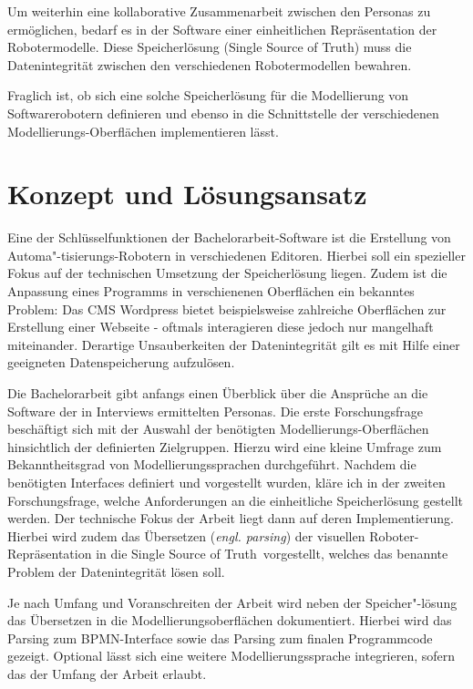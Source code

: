 \documentclass[a4paper, ngerman ]{article}
\newcommand{\ssot}{\glqq Single Source of Truth\grqq}
\begin{document}
Um weiterhin eine kollaborative Zusammenarbeit zwischen den Personas zu ermöglichen, bedarf es in der Software einer einheitlichen Repräsentation der Robotermodelle. Diese Speicherlösung (\ssot) muss die Datenintegrität zwischen den verschiedenen Robotermodellen bewahren. 

Fraglich ist, ob sich eine solche Speicherlösung für die Modellierung von Softwarerobotern definieren und ebenso in die Schnittstelle der verschiedenen Modellierungs-Oberflächen implementieren lässt.

\pagebreak

\section{Konzept und Lösungsansatz}

Eine der Schlüsselfunktionen der Bachelorarbeit-Software ist die Erstellung von Automa"-tisierungs-Robotern in verschiedenen Editoren. Hierbei soll ein spezieller Fokus auf der technischen Umsetzung der Speicherlösung liegen. Zudem ist die Anpassung eines Programms in verschienenen Oberflächen ein bekanntes Problem: Das CMS Wordpress bietet beispielsweise zahlreiche Oberflächen zur Erstellung einer Webseite - oftmals interagieren diese jedoch nur mangelhaft miteinander. Derartige Unsauberkeiten der Datenintegrität gilt es mit Hilfe einer geeigneten Datenspeicherung aufzulösen.

Die Bachelorarbeit gibt anfangs einen Überblick über die Ansprüche an die Software der in Interviews ermittelten Personas. Die erste Forschungsfrage beschäftigt sich mit der Auswahl der benötigten Modellierungs-Oberflächen hinsichtlich der definierten Zielgruppen. Hierzu wird eine kleine Umfrage zum Bekanntheitsgrad von Modellierungssprachen durchgeführt. Nachdem die benötigten Interfaces definiert und vorgestellt wurden, kläre ich in der zweiten Forschungsfrage, welche Anforderungen an die einheitliche Speicherlösung gestellt werden. Der technische Fokus der Arbeit liegt dann auf deren Implementierung. Hierbei wird zudem das Übersetzen (\textit{engl. parsing}) der visuellen Roboter-Repräsentation in die \ssot ~vorgestellt, welches das benannte Problem der Datenintegrität lösen soll. 

Je nach Umfang und Voranschreiten der Arbeit wird neben der Speicher"-lösung das Übersetzen in die Modellierungsoberflächen dokumentiert. Hierbei wird das Parsing zum BPMN-Interface sowie das Parsing zum finalen Programmcode gezeigt. Optional lässt sich  eine weitere Modellierungssprache integrieren, sofern das der Umfang der Arbeit erlaubt.
\end{document}
